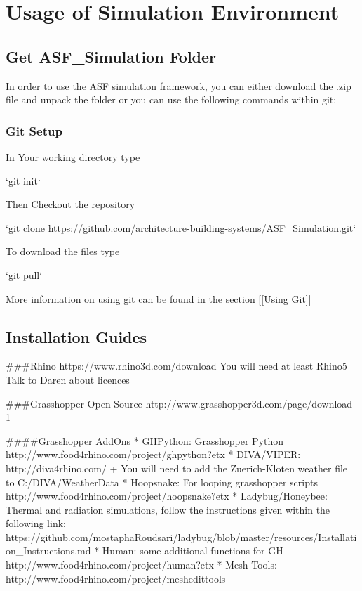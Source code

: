 
\chapter{Usage of Simulation Environment}\label{usage}

\section{Get ASF\_Simulation Folder}
	
	In order to use the ASF simulation framework, you can either download the .zip file and unpack the folder or you can use the following commands within git:

	\subsection{Git Setup}

	In Your working directory type

	`git init`

	Then Checkout the repository

	`git clone https://github.com/architecture-building-systems/ASF_Simulation.git`

	To download the files type

	`git pull`

	More information on using git can be found in the section [[Using Git]]

		
\section{Installation Guides}

	###Rhino
	https://www.rhino3d.com/download
	You will need at least Rhino5
	Talk to Daren about licences

	###Grasshopper
	Open Source
	http://www.grasshopper3d.com/page/download-1

	####Grasshopper AddOns
	* GHPython: Grasshopper Python http://www.food4rhino.com/project/ghpython?etx
	* DIVA/VIPER: http://diva4rhino.com/
	 + You will need to add the Zuerich-Kloten weather file to C:/DIVA/WeatherData
	* Hoopsnake: For looping grasshopper scripts http://www.food4rhino.com/project/hoopsnake?etx
	* Ladybug/Honeybee: Thermal and radiation simulations, follow the instructions given within the following link: https://github.com/mostaphaRoudsari/ladybug/blob/master/resources/Installation_Instructions.md
	* Human: some additional functions for GH http://www.food4rhino.com/project/human?etx
	* Mesh Tools: http://www.food4rhino.com/project/meshedittools


